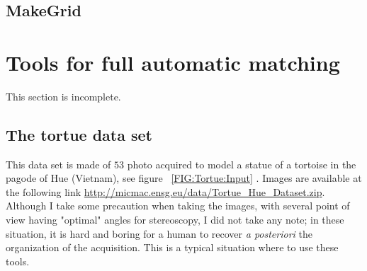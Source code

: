 

\subsection{MakeGrid}
\label{MAKEGRID}





\section{Tools for full automatic  matching}

This section is incomplete.

\label{FullAutoMatch}

\subsection{The tortue data set}

This data set is made  of $53$ photo acquired to model a statue of a tortoise in the
pagode of Hue (Vietnam), see figure ~\ref{FIG:Tortue:Input} . Images are available at the following link \url{http://micmac.ensg.eu/data/Tortue_Hue_Dataset.zip}. Although I take some precaution when taking the images,
with several point of view having "optimal" angles for stereoscopy, I did not take any
note; in these situation,  it is hard and boring for a human to recover \emph{a posteriori} the organization
of the acquisition. This is a typical situation where to use these tools.


